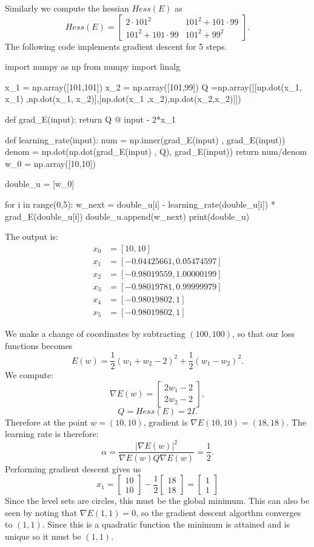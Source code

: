 \documentclass[12pt, a4paper]{article}
\theoremstyle{definition}
\newcommand{\grad}{\nabla}
\newcommand{\bmat}[1]{\begin{bmatrix}#1\end{bmatrix}}
\begin{document}
Similarly we compute the hessian $Hess(E)$ as
$$Hess(E) = \bmat{2\cdot 101^2 & 101^2 + 101\cdot99\\ 101^2 + 101\cdot 99 & 101^2 + 99^2}.$$
The following code implements gradient descent for 5 steps. 
\begin{python}
import numpy as np
from numpy import linalg

x_1 = np.array([101,101])
x_2 = np.array([101,99])
Q =np.array([[np.dot(x_1, x_1) ,np.dot(x_1, x_2)],[np.dot(x_1 ,x_2),np.dot(x_2,x_2)]])

def grad_E(input):
	return Q @ input - 2*x_1 

def learning_rate(input):
	num = np.inner(grad_E(input) , grad_E(input))
	denom = np.dot(np.dot(grad_E(input) , Q), grad_E(input)) 
	return num/denom
w_0 = np.array([10,10])

double_u = [w_0]

for i in range(0,5):
    w_next = double_u[i] - learning_rate(double_u[i]) * grad_E(double_u[i])
    double_u.append(w_next)
print(double_u)
\end{python}
The output is:
\begin{align*}	
	x_0  & =  [10, 10]
	\\ x_1 & = [-0.04425661,  0.05474597]
	\\ x_2 & = [-0.98019559,  1.00000199]
	\\ x_3 & = [-0.98019781,  0.99999979]
	\\ x_4 & = [-0.98019802,  1]
	\\ x_5 & =[-0.98019802,  1]
\end{align*}
\item We make a change of coordinates by subtracting $(100,100)$, so that our loss functions becomes $$E(w) = \frac{1}{2} (w_1 + w_2 -2)^2  +\frac{1}{2} (w_1 - w_2) ^2.$$
We compute:
$$\grad E(w) = \bmat{  2w_1 - 2\\ 2w_2 - 2  },$$
$$Q = Hess(E) = 2I.$$
Therefore at the point $w = (10,10)$, gradient is $\grad E(10,10) = (18,18)$. The learning rate is therefore:
$$\alpha = \frac{|\grad E(w)|^2}{\grad E(w) Q \grad E(w)} = \frac{1}{2}.$$
Performing gradient descent gives us 
$$x_1 = \bmat{10 \\ 10} - \frac{1}{2}\bmat{18 \\ 18} = \bmat{1 \\ 1}$$
Since the level sets are circles, this must be the global minimum. 
This can also be seen by noting that $\grad E(1,1) = 0$, so the gradient descent algorthm converges to $(1,1)$. Since this is a quadratic function the minimum is attained and is unique so it must be  $(1,1)$. 
\end{document}
